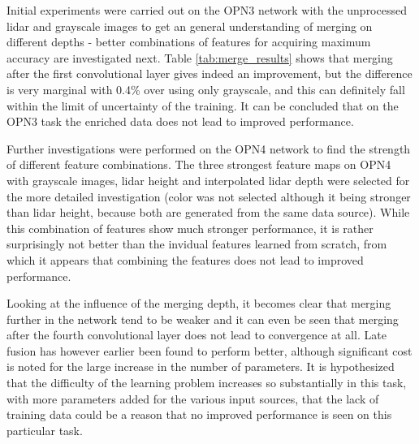 Initial experiments were carried out on the OPN3 network with the unprocessed lidar and grayscale images to get an general understanding of merging on different depths - better combinations of features for acquiring maximum accuracy are investigated next. Table \ref{tab:merge_results} shows that merging after the first convolutional layer gives indeed an improvement, but the difference is very marginal with 0.4\% over using only grayscale, and this can definitely fall within the limit of uncertainty of the training. It can be concluded that on the OPN3 task the enriched data does not lead to improved performance. 

Further investigations were performed on the OPN4 network to find the strength of different feature combinations. The three strongest feature maps on OPN4 with grayscale images, lidar height and interpolated lidar depth were selected for the more detailed investigation (color was not selected although it being stronger than lidar height, because both are generated from the same data source). While this combination of features show much stronger performance, it is rather surprisingly not better than the invidual features learned from scratch, from which it appears that combining the features does not lead to improved performance. 

Looking at the influence of the merging depth, it becomes clear that merging further in the network tend to be weaker and it can even be seen that merging after the fourth convolutional layer does not lead to convergence at all. Late fusion has however earlier been found to perform better\cite{schlosser2016}, although significant cost is noted for the large increase in the number of parameters. It is hypothesized that the difficulty of the learning problem increases so substantially in this task, with more parameters added for the various input sources, that the lack of training data could be a reason that no improved performance is seen on this particular task. 

